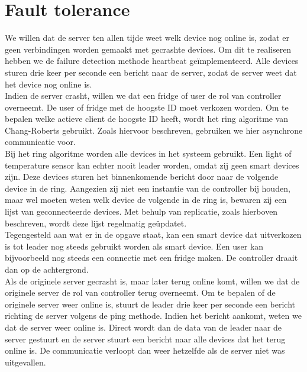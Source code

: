 \documentclass[a4paper]{article}
\begin{document}
	\section{Fault tolerance}
		We willen dat de server ten allen tijde weet welk device nog online is, zodat er geen verbindingen worden gemaakt met gecrashte devices. Om dit te realiseren hebben we de failure detection methode heartbeat ge\"implementeerd. Alle devices sturen drie keer per seconde een bericht naar de server, zodat de server weet dat het device nog online is. \\
		Indien de server crasht, willen we dat een fridge of user de rol van controller overneemt. De user of fridge met de hoogste ID moet verkozen worden. Om te bepalen welke actieve client de hoogste ID heeft, wordt het ring algoritme van Chang-Roberts gebruikt. Zoals hiervoor beschreven, gebruiken we hier asynchrone communicatie voor. \\
		Bij het ring algoritme worden alle devices in het systeem gebruikt. Een light of temperature sensor kan echter nooit leader worden, omdat zij geen smart devices zijn. Deze devices sturen het binnenkomende bericht door naar de volgende device in de ring. Aangezien zij niet een instantie van de controller bij houden, maar wel moeten weten welk device de volgende in de ring is, bewaren zij een lijst van geconnecteerde devices. Met behulp van replicatie, zoals hierboven beschreven, wordt deze lijst regelmatig ge\"updatet. \\
		Tegengesteld aan wat er in de opgave staat, kan een smart device dat uitverkozen is tot leader nog steeds gebruikt worden als smart device. Een user kan bijvoorbeeld nog steeds een connectie met een fridge maken. De controller draait dan op de achtergrond. \\
		Als de originele server gecrasht is, maar later terug online komt, willen we dat de originele server de rol van controller terug overneemt. Om te bepalen of de originele server weer online is, stuurt de leader drie keer per seconde een bericht richting de server volgens de ping methode. Indien het bericht aankomt, weten we dat de server weer online is. Direct wordt dan de data van de leader naar de server gestuurt en de server stuurt een bericht naar alle devices dat het terug online is. De communicatie verloopt dan weer hetzelfde als de server niet was uitgevallen.
	
	\newpage
\end{document}
